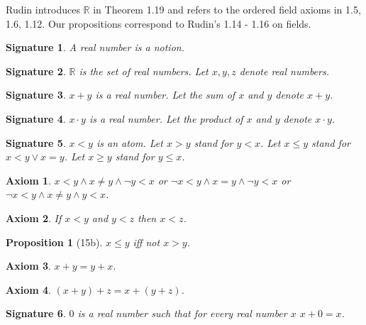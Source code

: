 \documentclass{article}
\newenvironment{forthel}{\begin{leftbar}}{\end{leftbar}}
\newtheorem{axiom}{Axiom}
\newtheorem{signature}{Signature}
\newtheorem{proposition}{Proposition}
\newcommand{\RR}{\mathbb{R}}
\begin{document}
Rudin introduces $\RR$ in Theorem 1.19 and refers to the ordered field 
axioms in 1.5, 1.6, 1.12. Our propositions correspond to Rudin's 1.14 - 1.16 on fields. 

\begin{forthel}
[number/-s]
\begin{signature} A \emph{real number} is a notion.\end{signature}
\begin{signature} $\RR$ is the set of \emph{real numbers}.
Let $x,y,z$ denote real numbers.
\end{signature}

\begin{signature} $x + y$ is a real number.
Let the \emph{sum} of $x$ and $y$ denote $x + y$.\end{signature}

\begin{signature} $x \cdot y$ is a real number.
Let the \emph{product} of $x$ and $y$ denote $x \cdot y$.\end{signature}

\begin{signature} $x < y$ is an atom.
Let $x > y$ stand for $y < x$.
Let $x \leq y$ stand for $x < y \vee x = y$.
Let $x \geq y$ stand for $y \leq x$.\end{signature}

\begin{axiom} $x < y \wedge x \neq y \wedge \neg y < x$
or $\neg x < y \wedge x = y \wedge \neg y < x$
or $\neg x < y \wedge x \neq y \wedge y < x$.\end{axiom}

\begin{axiom} If $x < y$ and $y < z$ then $x < z$.
\end{axiom}

\begin{proposition}[15b] $x \leq y$ iff not $x > y$.\end{proposition}

\begin{axiom} $x + y = y + x$.\end{axiom}

\begin{axiom} $(x + y) + z = x + (y + z)$.\end{axiom}

\begin{signature} $0$ is a real number such that
for every real number $x$ $x + 0 = x$.\end{signature}


\end{forthel}
\end{document}
